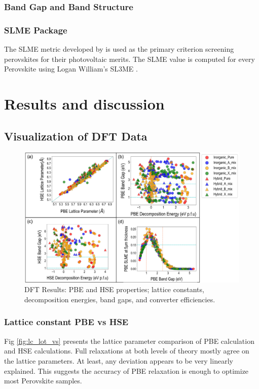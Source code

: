 \documentclass[twoside, twocolumn, 9pt, draft]{article}
\begin{document}
\subsubsection*{Band Gap and Band Structure}
\label{sec:org96f949d}

\subsubsection*{SLME Package}
\label{sec:org98c6074}
The SLME metric developed by \citet{yu-2012-ident-poten} is used as the
primary criterion screening perovskites for their photovoltaic
merits. The SLME value is computed for every Perovskite using Logan
William's SL3ME \cite{williams-2022-sl3me}.
\section*{Results and discussion}
\label{sec:org1b2919e}
\subsection*{Visualization of DFT Data}
\label{sec:org1c13c89}
\begin{figure}
\centering
\includegraphics[width=.9\linewidth]{Figure2.png}
\caption{\label{fig:pairplots} DFT Results: PBE and HSE properties; lattice constants, decomposition energies, band gaps, and converter efficiencies.}
\end{figure}

\subsubsection*{Lattice constant PBE vs HSE}
\label{sec:orged355d8}
Fig \ref{fig:lc_lot_vs} presents the lattice parameter comparison of PBE
calculation and HSE calculations. Full relaxations at both levels of
theory mostly agree on the lattice parameters. At least, any deviation
appears to be very linearly explained. This suggests the accuracy of
PBE relaxation is enough to optimize most Perovskite samples.
\end{document}
